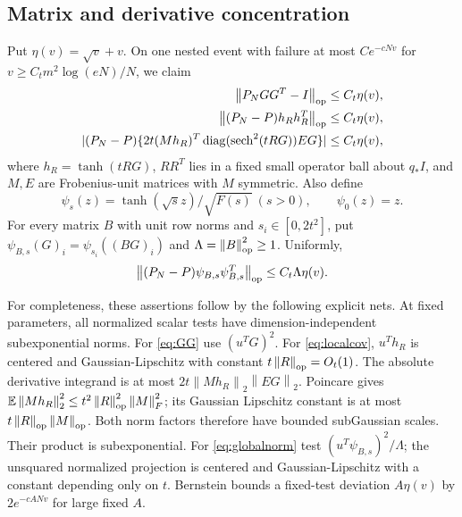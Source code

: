 \documentclass[11pt]{article}
\newcommand{\diag}{\operatorname{diag}}\newcommand{\sech}{\operatorname{sech}}
\newcommand{\norm}[1]{\left\lVert#1\right\rVert}
\begin{document}
\subsection{Matrix and derivative concentration}
Put $\eta(v)=\sqrt v+v$. On one nested event with failure at most $Ce^{-cNv}$ for $v\ge C_tm^2\log(eN)/N$, we claim
\begin{align}
 \norm{P_NGG^T-I}_{\op}&\le C_t\eta(v),\label{eq:GG}\\
 \norm{(P_N-P)h_Rh_R^T}_{\op}&\le C_t\eta(v),\label{eq:localcov}\\
 |(P_N-P)\{2t(Mh_R)^T\diag(\sech^2(tRG))EG\}|&\le C_t\eta(v),\label{eq:derivative}
\end{align}
where $h_R=\tanh(tRG)$, $RR^T$ lies in a fixed small operator ball about $q_*I$, and $M,E$ are Frobenius-unit matrices with $M$ symmetric. Also define
\[
 \psi_s(z)=\tanh(\sqrt s z)/\sqrt{F(s)}\ (s>0),\qquad \psi_0(z)=z.
\]
For every matrix $B$ with unit row norms and $s_i\in[0,2t^2]$, put $\psi_{B,s}(G)_i=\psi_{s_i}((BG)_i)$ and $\Lambda=\norm B_{\op}^2\ge1$. Uniformly,
\begin{equation}\label{eq:globalnorm}
 \norm{(P_N-P)\psi_{B,s}\psi_{B,s}^T}_{\op}\le C_t\Lambda\eta(v).
\end{equation}

For completeness, these assertions follow by the following explicit nets. At fixed parameters, all normalized scalar tests have dimension-independent subexponential norms. For \eqref{eq:GG} use $(u^TG)^2$. For \eqref{eq:localcov}, $u^Th_R$ is centered and Gaussian-Lipschitz with constant $t\norm R_{\op}=O_t(1)$. The absolute derivative integrand is at most $2t\norm{Mh_R}_2\norm{EG}_2$. Poincare gives $\E\norm{Mh_R}_2^2\le t^2\norm R_{\op}^2\norm M_F^2$; its Gaussian Lipschitz constant is at most $t\norm R_{\op}\norm M_{\op}$. Both norm factors therefore have bounded subGaussian scales. Their product is subexponential. For \eqref{eq:globalnorm} test $(u^T\psi_{B,s})^2/\Lambda$; the unsquared normalized projection is centered and Gaussian-Lipschitz with a constant depending only on $t$. Bernstein bounds a fixed-test deviation $A\eta(v)$ by $2e^{-cANv}$ for large fixed $A$.
\end{document}
